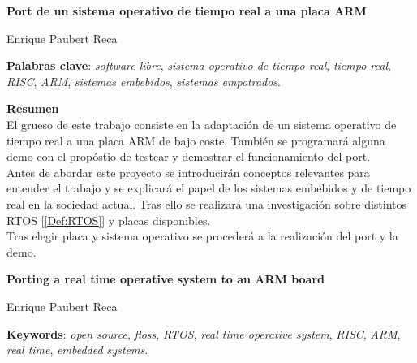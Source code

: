 \thispagestyle{empty}

\begin{center}
	{\large\bfseries Port de un sistema operativo de tiempo real a una placa ARM}\\
\end{center}
\begin{center}
	Enrique Paubert Reca\\
\end{center}

\vspace{0.7cm}

\vspace{0.5cm}
\noindent\textbf{Palabras clave}: \textit{software libre}, \textit{sistema operativo de tiempo real}, \textit{tiempo real}, \textit{RISC}, \textit{ARM}, \textit{sistemas embebidos}, \textit{sistemas empotrados}.
\vspace{0.7cm}

\noindent\textbf{Resumen}\\

El grueso de este trabajo consiste en la adaptación de un sistema operativo de tiempo real a una placa ARM de bajo coste. También se programará alguna demo con el propóstio de testear y demostrar el funcionamiento del port.\\

Antes de abordar este proyecto se introducirán conceptos relevantes para entender el trabajo y se explicará el papel de los sistemas embebidos y de tiempo real en la sociedad actual. Tras ello se realizará una investigación sobre distintos RTOS [\ref{Def:RTOS}] y placas disponibles.\\

Tras elegir placa y sistema operativo se procederá a la realización del port y la demo.\\


\cleardoublepage

\begin{center}
	{\large\bfseries Porting a real time operative system to an ARM board}\\
\end{center}
\begin{center}
	Enrique Paubert Reca\\
\end{center}
\vspace{0.7cm}
\vspace{0.5cm}
\noindent\textbf{Keywords}: \textit{open source}, \textit{floss}, \textit{RTOS}, \textit{real time operative system}, \textit{RISC}, \textit{ARM}, \textit{real time}, \textit{embedded systems}.
\vspace{0.7cm}

